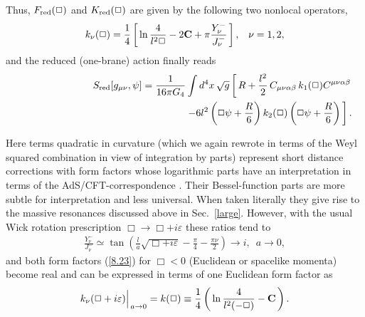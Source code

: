 \documentclass[a4paper,preprint,nofootinbib,
                 showpacs,preprintnumbers,amsmath,amssymb]{revtex4}
\begin{document}
Thus, $F_{\rm red}(\Box)$ and $K_{\rm red}(\Box)$ are given by the 
following two nonlocal operators, 
    \begin{equation} 
    k_\nu(\Box)=\frac14\left[\,\ln\frac4{l^2\Box} 
    -2{\bf C}+ 
    \pi\frac{Y_\nu^-}{J_\nu^-}\,\right], 
    \,\,\,\,\,\nu=1,2,                            \label{8.23} 
    \end{equation} 
and the reduced (one-brane) action finally reads 
    \begin{eqnarray} 
    &&S_{\rm red}[g_{\mu\nu},\psi] 
    =\frac1{16\pi G_4}\int d^4x\,\sqrt{g} 
    \left[\,R+\frac{l^2}2\, 
      C_{\mu\nu\alpha\beta}\,k_1(\Box) 
      C^{\mu\nu\alpha\beta} 
      \right. \nonumber\\ 
    &&\qquad\qquad\qquad\qquad\qquad\qquad\qquad\qquad 
    \left.-6l^2\left(\Box\psi+ 
    \frac R6\right)k_2(\Box) 
    \left(\Box\psi+\frac R6\right)\,\right]. \label{8.24} 
    \end{eqnarray} 
 
Here terms quadratic in curvature (which we again rewrote in terms 
of the Weyl squared combination in view of integration by parts) 
represent short distance 
corrections with form factors whose logarithmic parts have 
an interpretation in terms of the AdS/CFT-correspondence 
\cite{AdS/CFT,Gubser,logcoef,brane}. Their Bessel-function parts 
are more subtle for interpretation and less universal. When taken 
literally they give rise to the massive resonances discussed above in 
Sec.~\ref{large}. However, with the usual Wick rotation prescription 
$\Box\to\Box+i\varepsilon$ these ratios tend to 
    \begin{eqnarray} 
    \frac{Y_\nu^-}{J_\nu^-}\simeq 
    \tan\left(\frac{l}a\sqrt{\Box+i\varepsilon} 
    -\frac\pi4-\frac{\pi\nu}2\right)\to i, 
    \,\,\,a\to 0,                   \label{8.25} 
    \end{eqnarray} 
and both form factors (\ref{8.23}) for $\Box<0$ (Euclidean or 
spacelike momenta) become real and can be expressed in terms of one 
Euclidean form factor as 
    \begin{eqnarray} 
    k_\nu(\Box+i\varepsilon)\Big|_{\,a\to 0}=k(\Box)\equiv 
    \frac14\left(\,\ln\frac4{l^2(-\Box)} 
    -{\bf C}\,\right).                    \label{8.26} 
    \end{eqnarray} 
 
\end{document}
